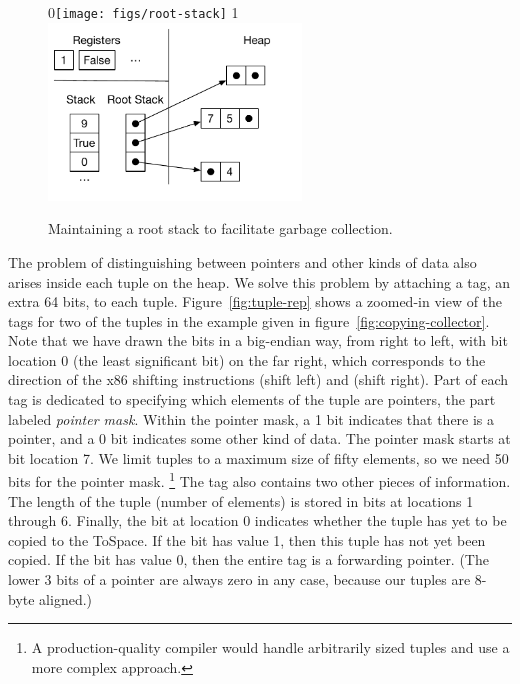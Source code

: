 \documentclass[7x10]{TimesAPriori_MIT}%
\def\racketEd{0}
\def\pythonEd{1}
\def\edition{0}
\newcommand{\racket}[1]{{\if\edition\racketEd{#1}\fi}}
\newcommand{\python}[1]{{\if\edition\pythonEd #1\fi}}
\numberwithin{theorem}{chapter}
\numberwithin{definition}{chapter}
\numberwithin{equation}{chapter}
\begin{document}
\begin{figure}[tbp]
  \centering
  \begin{tcolorbox}[colback=white]
    \racket{\texttt{[image: figs/root-stack]}}
  \python{\includegraphics[width=0.60\textwidth]{figs/root-stack-python}}
  \end{tcolorbox}

  \caption{Maintaining a root stack to facilitate garbage collection.}
\label{fig:shadow-stack}
\end{figure}

The problem of distinguishing between pointers and other kinds of data
also arises inside each tuple on the heap. We solve this problem by
attaching a tag, an extra 64 bits, to each
tuple. Figure~\ref{fig:tuple-rep} shows a zoomed-in view of the tags for
two of the tuples in the example given in figure~\ref{fig:copying-collector}.
Note that we have drawn the bits in a big-endian way, from right to left,
with bit location 0 (the least significant bit) on the far right,
which corresponds to the direction of the x86 shifting instructions
 (shift left) and  (shift right). Part of each tag
is dedicated to specifying which elements of the tuple are pointers,
the part labeled \emph{pointer mask}. Within the pointer mask, a 1 bit
indicates that there is a pointer, and a 0 bit indicates some other kind of
data. The pointer mask starts at bit location 7. We limit tuples to a
maximum size of fifty elements, so we need 50 bits for the pointer
mask.%
%
\footnote{A production-quality compiler would handle
arbitrarily sized tuples and use a more complex approach.}
%
The tag also contains two other pieces of information. The length of
the tuple (number of elements) is stored in bits at locations 1 through
6. Finally, the bit at location 0 indicates whether the tuple has yet
to be copied to the ToSpace.  If the bit has value 1, then this tuple
has not yet been copied.  If the bit has value 0, then the entire tag
is a forwarding pointer. (The lower 3 bits of a pointer are always
zero in any case, because our tuples are 8-byte aligned.)
\end{document}
